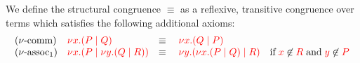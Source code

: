\begin{definition}\label{def:cp-equiv}
  We define the structural congruence $\equiv$ as a reflexive, transitive
  congruence over terms which satisfies the following additional axioms:
  \[
    \begin{array}{llll}
      (\nu\text{-comm})
      & \textcolor{red}{\nu x.(P \mid Q)}
      & \equiv \;
      & \textcolor{red}{\nu x.(Q \mid P)}
      \\
      (\nu\text{-assoc}_{1})
      & \textcolor{red}{\nu x.(P \mid \nu y.(Q \mid R))}
      & \equiv \;
      & \textcolor{red}{\nu y.(\nu x.(P \mid Q) \mid R)}
        \quad \text{if} \; \textcolor{red}{x}\not\in\textcolor{red}{R} \; \text{and} \; \textcolor{red}{y}\not\in\textcolor{red}{P}
    \end{array}
  \]
\end{definition}
